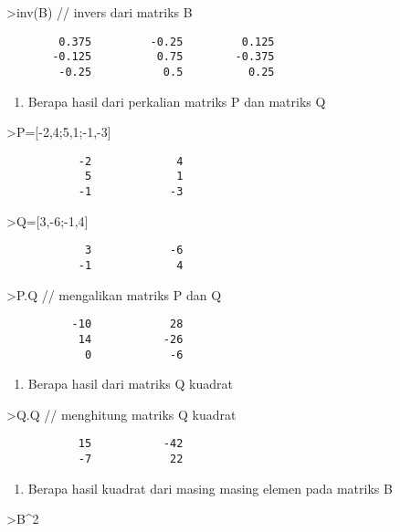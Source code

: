 \documentclass[
]{book}
\providecommand{\tightlist}{%
  \setlength{\itemsep}{0pt}\setlength{\parskip}{0pt}}
\begin{document}
\textgreater inv(B) // invers dari matriks B

\begin{verbatim}
        0.375         -0.25         0.125 
       -0.125          0.75        -0.375 
        -0.25           0.5          0.25 
\end{verbatim}

\begin{enumerate}
\def\labelenumi{\arabic{enumi}.}
\setcounter{enumi}{2}
\tightlist
\item
  Berapa hasil dari perkalian matriks P dan matriks Q
\end{enumerate}

\textgreater P={[}-2,4;5,1;-1,-3{]}

\begin{verbatim}
           -2             4 
            5             1 
           -1            -3 
\end{verbatim}

\textgreater Q={[}3,-6;-1,4{]}

\begin{verbatim}
            3            -6 
           -1             4 
\end{verbatim}

\textgreater P.Q // mengalikan matriks P dan Q

\begin{verbatim}
          -10            28 
           14           -26 
            0            -6 
\end{verbatim}

\begin{enumerate}
\def\labelenumi{\arabic{enumi}.}
\setcounter{enumi}{3}
\tightlist
\item
  Berapa hasil dari matriks Q kuadrat
\end{enumerate}

\textgreater Q.Q // menghitung matriks Q kuadrat

\begin{verbatim}
           15           -42 
           -7            22 
\end{verbatim}

\begin{enumerate}
\def\labelenumi{\arabic{enumi}.}
\setcounter{enumi}{4}
\tightlist
\item
  Berapa hasil kuadrat dari masing masing elemen pada matriks B
\end{enumerate}

\textgreater B\^{}2
\end{document}
